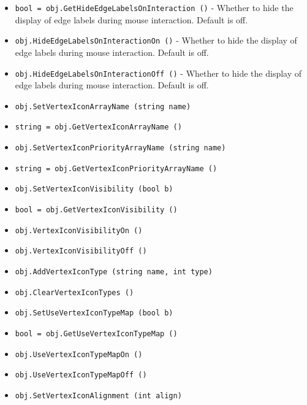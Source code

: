 \begin{itemize}
\item  \verb|bool = obj.GetHideEdgeLabelsOnInteraction ()| -  Whether to hide the display of edge labels during mouse interaction.  Default is off.

\item  \verb|obj.HideEdgeLabelsOnInteractionOn ()| -  Whether to hide the display of edge labels during mouse interaction.  Default is off.

\item  \verb|obj.HideEdgeLabelsOnInteractionOff ()| -  Whether to hide the display of edge labels during mouse interaction.  Default is off.

\item  \verb|obj.SetVertexIconArrayName (string name)|

\item  \verb|string = obj.GetVertexIconArrayName ()|

\item  \verb|obj.SetVertexIconPriorityArrayName (string name)|

\item  \verb|string = obj.GetVertexIconPriorityArrayName ()|

\item  \verb|obj.SetVertexIconVisibility (bool b)|

\item  \verb|bool = obj.GetVertexIconVisibility ()|

\item  \verb|obj.VertexIconVisibilityOn ()|

\item  \verb|obj.VertexIconVisibilityOff ()|

\item  \verb|obj.AddVertexIconType (string name, int type)|

\item  \verb|obj.ClearVertexIconTypes ()|

\item  \verb|obj.SetUseVertexIconTypeMap (bool b)|

\item  \verb|bool = obj.GetUseVertexIconTypeMap ()|

\item  \verb|obj.UseVertexIconTypeMapOn ()|

\item  \verb|obj.UseVertexIconTypeMapOff ()|

\item  \verb|obj.SetVertexIconAlignment (int align)|


\end{itemize}
